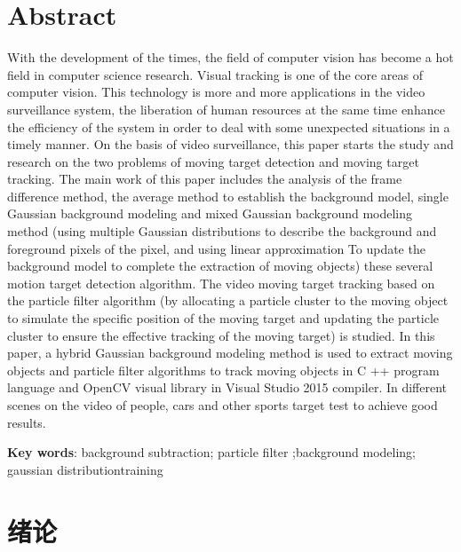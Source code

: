 \documentclass[UTF8, twoside]{ctexart}
\begin{document}
\section*{\arialfont\bfseries Abstract}
\titlespacing*{\section}{0pt}{0pt}{34pt}
\vspace*{0.2cm}
With the development of the times, the field of computer vision has become a hot field in computer science research. Visual tracking is one of the core areas of computer vision. This technology is more and more applications in the video surveillance system, the liberation of human resources at the same time enhance the efficiency of the system in order to deal with some unexpected situations in a timely manner.
On the basis of video surveillance, this paper starts the study and research on the two problems of moving target detection and moving target tracking. The main work of this paper includes the analysis of the frame difference method, the average method to establish the background model, single Gaussian background modeling and mixed Gaussian background modeling method (using multiple Gaussian distributions to describe the background and foreground pixels of the pixel, and using linear approximation To update the background model to complete the extraction of moving objects) these several motion target detection algorithm. The video moving target tracking based on the particle filter algorithm (by allocating a particle cluster to the moving object to simulate the specific position of the moving target and updating the particle cluster to ensure the effective tracking of the moving target) is studied.
In this paper, a hybrid Gaussian background modeling method is used to extract moving objects and particle filter algorithms to track moving objects in C ++ program language and OpenCV visual library in Visual Studio 2015 compiler. In different scenes on the video of people, cars and other sports target test to achieve good results.

\vspace{1.4em}
\noindent\textbf{Key words}: background subtraction; particle filter ;background modeling; gaussian distributiontraining
\newpage

\tableofcontents
\newpage

\vspace*{3pt}
\section{绪论}
\end{document}
